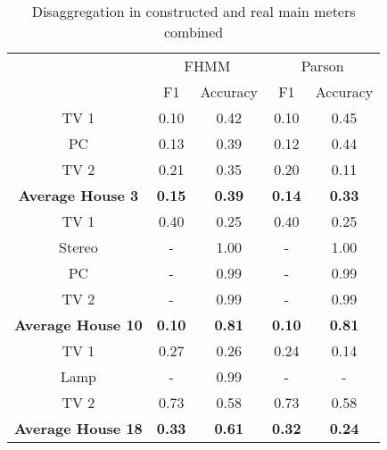 \begin{table}[H]                             
\centering                                   
\begin{tabular}{|c|c|c|c|c|}                 
\cline{2-5}                                      
\multicolumn{1}{c|}{} & \multicolumn{2}{|c|}{FHMM} & \multicolumn{2}{c|}{Parson} \\                      
\cline{2-5}                                        
\multicolumn{1}{c|}{} & F1 & Accuracy & F1 & Accuracy \\          
\hline                                         
TV 1 & 0.10 & 0.42 & 0.10 & 0.45 \\          
\hline                                       
PC & 0.13 & 0.39 & 0.12 & 0.44 \\            
\hline                                       
TV 2 & 0.21 & 0.35 & 0.20 & 0.11 \\          
\hline                                       
\textbf{Average House 3} & \textbf{0.15} & \textbf{0.39} & \textbf{0.14} & \textbf{0.33} \\ 
\hline                                       
TV 1 & 0.40 & 0.25 & 0.40 & 0.25 \\          
\hline                                       
Stereo & - & 1.00 & - & 1.00 \\              
\hline                                       
PC & - & 0.99 & - & 0.99 \\                  
\hline                                       
TV 2 & - & 0.99 & - & 0.99 \\                
\hline                                       
\textbf{Average House 10} & \textbf{0.10} & \textbf{0.81} & \textbf{0.10} & \textbf{0.81} \\
\hline                                       
TV 1 & 0.27 & 0.26 & 0.24 & 0.14 \\          
\hline                                       
Lamp & - & 0.99 & - & - \\                   
\hline                                       
TV 2 & 0.73 & 0.58 & 0.73 & 0.58 \\          
\hline                                       
\textbf{Average House 18} & \textbf{0.33} & \textbf{0.61} & \textbf{0.32} & \textbf{0.24} \\
\hline                                       
\end{tabular}                                
\caption{Disaggregation in constructed and real main meters combined}                     
\label{table:Tab:SHGSIMREAL}                 
\end{table}     